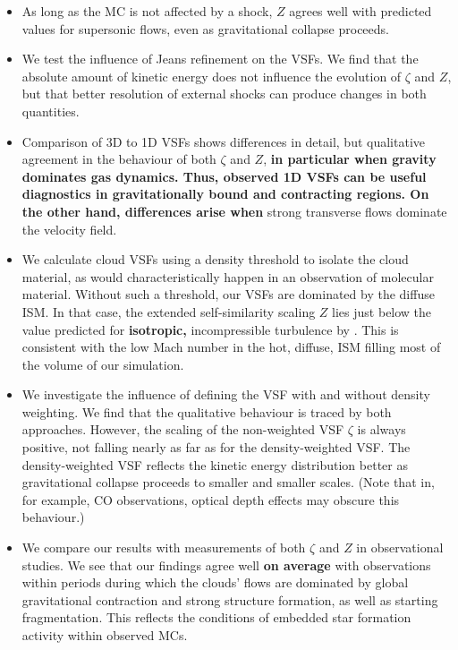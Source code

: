 \begin{itemize}
\begin{itemize}
{        }
    \end{itemize}
	\item As long as the MC is not affected by a shock, $Z$ agrees well with predicted values for supersonic flows, even as gravitational collapse proceeds.
	\item We test the influence of Jeans refinement on the VSFs. We find that the absolute amount of kinetic energy does not influence the evolution of $\zeta$ and $Z$, but that better resolution of external shocks can produce changes in both quantities.
	\item Comparison of 3D to 1D VSFs shows differences in detail, but qualitative agreement in the behaviour of both $\zeta$ and $Z$, \textbf{in particular when gravity dominates gas dynamics. Thus, observed 1D VSFs can be useful diagnostics in gravitationally bound and contracting regions. On the other hand, differences arise when} strong transverse flows dominate the velocity field. 
	\item We calculate cloud VSFs using a density threshold to isolate the cloud material, as would characteristically happen in an observation of molecular material. Without such a threshold, our VSFs are dominated by the diffuse ISM. In that case, the extended self-similarity scaling $Z$ lies just below the value predicted for \textbf{isotropic,} incompressible turbulence by \citet{She1994}. This is consistent with the low Mach number in the hot, diffuse, ISM filling most of the volume of our simulation.
	\item We investigate the influence of defining the VSF with and without density weighting. We find that the qualitative behaviour is traced by both approaches. However, the scaling of the non-weighted VSF $\zeta$ is always positive, not falling nearly as far as for the density-weighted VSF. The density-weighted VSF reflects the kinetic energy distribution better as gravitational collapse proceeds to smaller and smaller scales. (Note that in, for example, CO observations, optical depth effects may obscure this behaviour.) 
	\item We compare our results with measurements of both $\zeta$ and $Z$ in observational studies. We see that our findings agree well \textbf{on average} with observations within periods during which the clouds' flows are dominated by global gravitational contraction and strong structure formation, as well as starting fragmentation. This reflects the conditions of embedded star formation activity within observed MCs.
\end{itemize}

